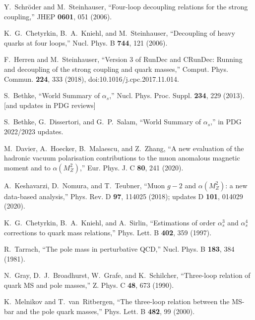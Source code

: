 \documentclass[aps,prd,onecolumn,amsmath,amssymb,superscriptaddress,nofootinbib,showpacs,showkeys]{revtex4-2}
\begin{document}
\begin{thebibliography}{99}
Y.~Schröder and M.~Steinhauser,
``Four-loop decoupling relations for the strong coupling,''
JHEP \textbf{0601}, 051 (2006).

K.~G.~Chetyrkin, B.~A.~Kniehl, and M.~Steinhauser,
``Decoupling of heavy quarks at four loops,''
Nucl. Phys. B \textbf{744}, 121 (2006).

F.~Herren and M.~Steinhauser,
``Version 3 of RunDec and CRunDec: Running and decoupling of the strong coupling and quark masses,''
Comput. Phys. Commun. \textbf{224}, 333 (2018),
doi:10.1016/j.cpc.2017.11.014.

S.~Bethke,
``World Summary of $\alpha_s$,''
Nucl. Phys. Proc. Suppl. \textbf{234}, 229 (2013). [and updates in PDG reviews]

S.~Bethke, G.~Dissertori, and G.~P.~Salam,
``World Summary of $\alpha_s$,''
in PDG 2022/2023 updates.

M.~Davier, A.~Hoecker, B.~Malaescu, and Z.~Zhang,
``A new evaluation of the hadronic vacuum polarisation contributions to the muon anomalous magnetic moment and to $\alpha(M_Z^2)$,''
Eur. Phys. J. C \textbf{80}, 241 (2020).

A.~Keshavarzi, D.~Nomura, and T.~Teubner,
``Muon $g-2$ and $\alpha(M_Z^2)$: a new data-based analysis,''
Phys. Rev. D \textbf{97}, 114025 (2018); updates D \textbf{101}, 014029 (2020).



K.~G.~Chetyrkin, B.~A.~Kniehl, and A.~Sirlin,
``Estimations of order $\alpha_s^3$ and $\alpha_s^4$ corrections to quark mass relations,''
Phys. Lett. B \textbf{402}, 359 (1997).



R.~Tarrach,
``The pole mass in perturbative QCD,''
Nucl. Phys. B \textbf{183}, 384 (1981).

N.~Gray, D.~J.~Broadhurst, W.~Grafe, and K.~Schilcher,
``Three-loop relation of quark MS and pole masses,''
Z. Phys. C \textbf{48}, 673 (1990).

K.~Melnikov and T.~van~Ritbergen,
``The three-loop relation between the MS-bar and the pole quark masses,''
Phys. Lett. B \textbf{482}, 99 (2000).



\end{thebibliography}
\end{document}
